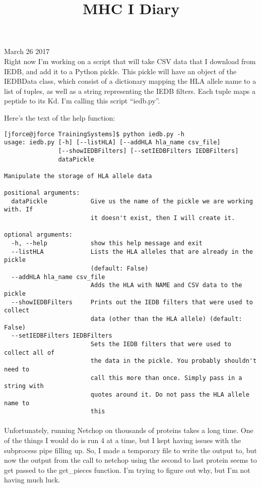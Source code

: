 \documentclass[11pt,letterpaper]{article}
\begin{document}

\title{MHC I Diary}

{\Huge March 26 2017}\\[5mm]

Right now I'm working on a script that will take CSV data that I download from IEDB, and add it to a Python pickle. This pickle will have an object of the IEDBData class, which consist of a dictionary mapping the HLA allele name to a list of tuples, as well as a string representing the IEDB filters. Each tuple maps a peptide to its Kd. I'm calling this script ``iedb.py''.


Here's the text of the help function:

\begin{lstlisting}
[jforce@jforce TrainingSystems]$ python iedb.py -h
usage: iedb.py [-h] [--listHLA] [--addHLA hla_name csv_file]
               [--showIEDBFilters] [--setIEDBFilters IEDBFilters]
               dataPickle

Manipulate the storage of HLA allele data

positional arguments:
  dataPickle            Give us the name of the pickle we are working with. If
                        it doesn't exist, then I will create it.

optional arguments:
  -h, --help            show this help message and exit
  --listHLA             Lists the HLA alleles that are already in the pickle
                        (default: False)
  --addHLA hla_name csv_file
                        Adds the HLA with NAME and CSV data to the pickle
  --showIEDBFilters     Prints out the IEDB filters that were used to collect
                        data (other than the HLA allele) (default: False)
  --setIEDBFilters IEDBFilters
                        Sets the IEDB filters that were used to collect all of
                        the data in the pickle. You probably shouldn't need to
                        call this more than once. Simply pass in a string with
                        quotes around it. Do not pass the HLA allele name to
                        this
\end{lstlisting}


\paragraph{} Unfortunately, running Netchop on thousands of proteins takes a long time. One of the things I would do is run 4 at a time, but I kept having issues with the subprocess pipe filling up. So, I made a temporary file to write the output to, but now the output from the call to netchop using the second to last protein seems to get passed to the get\_pieces function. I'm trying to figure out why, but I'm not having much luck.  
\end{document}
